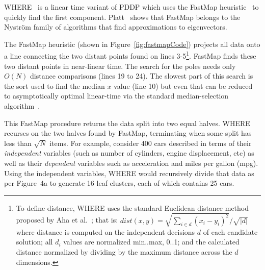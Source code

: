 \documentclass[10pt,journal,compsoc]{IEEEtran}
\newcommand{\fig}[1]{Figure~\ref{fig:#1}}
\begin{document}
WHERE~\cite{me12d} is a linear time variant of PDDP  which uses the FastMap heuristic~\cite{Faloutsos1995}
to quickly find the first component.
Platt~\cite{platt05} shows that FastMap belongs to the Nystr\"om family
of algorithms that find approximations to eigenvectors.

The FastMap heuristic (shown in \fig{fastmapCode})
projects all data onto a line
connecting the two distant points found on lines 3-5\footnote{
To define distance, WHERE uses 
the standard Euclidean distance method proposed by 
Aha et al.~\cite{aha91}; that is:
$dist(x,y)= \sqrt{\sum_{i\in d} (x_i - y_i)^2}/\sqrt{ 
\left\vert{d}\right\vert }$ where distance is
computed on the independent decisions $d$ of each candidate solution;
all $d_i$ values are normalized min..max, 0..1; and the calculated distance normalized by dividing by the maximum distance
across the $d$ dimensions.}. 
FastMap finds these two distant points in near-linear
time. The search for the poles needs only
$O(N)$ distance comparisons (lines 19 to 24).
The slowest part of this search is the sort used to find the median $x$ value 
(line 10) but even that
can be reduced to  asymptotically optimal linear-time
via the standard median-selection algorithm~\cite{hoare61}.

This FastMap procedure returns the data split into two
equal halves.
WHERE recurses on the two halves found by FastMap,
terminating when some split
has less than $\sqrt{N}$ items.
For example, consider 400 cars described in terms of
their {\em independent} variables
(such as number of cylinders, engine displacement, etc)
as well as their {\em dependent} variables such as
acceleration and miles per gallon (mpg).
Using the independent variables,
WHERE would recursively divide that data as per Figure~4a to generate 16 leaf
clusters, each of which contains 25 cars.
\end{document}
